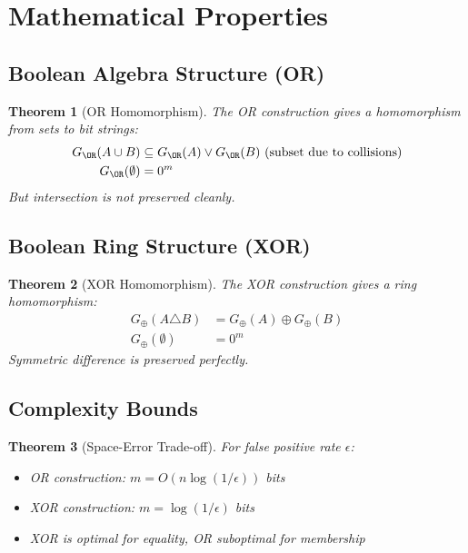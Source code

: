 \documentclass[11pt,final,hidelinks]{article}
\newcommand{\XOR}{\oplus}
\newtheorem{theorem}{Theorem}[section]
\begin{document}
\section{Mathematical Properties}

\subsection{Boolean Algebra Structure (OR)}

\begin{theorem}[OR Homomorphism]
The OR construction gives a homomorphism from sets to bit strings:
\begin{align}
G_{\OR}(A \cup B) &\subseteq G_{\OR}(A) \lor G_{\OR}(B) \text{ (subset due to collisions)}\\
G_{\OR}(\emptyset) &= 0^m
\end{align}
But intersection is not preserved cleanly.
\end{theorem}

\subsection{Boolean Ring Structure (XOR)}

\begin{theorem}[XOR Homomorphism]
The XOR construction gives a ring homomorphism:
\begin{align}
G_{\XOR}(A \triangle B) &= G_{\XOR}(A) \oplus G_{\XOR}(B)\\
G_{\XOR}(\emptyset) &= 0^m
\end{align}
Symmetric difference is preserved perfectly.
\end{theorem}

\subsection{Complexity Bounds}

\begin{theorem}[Space-Error Trade-off]
For false positive rate $\epsilon$:
\begin{itemize}
    \item OR construction: $m = O(n \log(1/\epsilon))$ bits
    \item XOR construction: $m = \log(1/\epsilon)$ bits
    \item XOR is optimal for equality, OR suboptimal for membership
\end{itemize}
\end{theorem}
\end{document}
